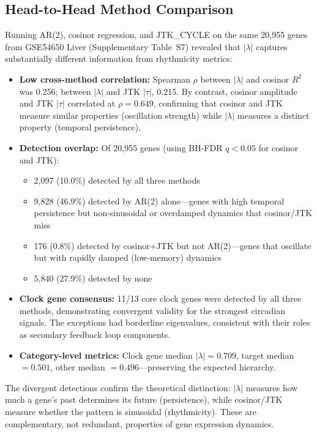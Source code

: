 \documentclass[11pt,letterpaper]{article}
\begin{document}
\subsection{Head-to-Head Method Comparison}
\label{sec:headtohead-results}

Running AR(2), cosinor regression, and JTK\_CYCLE on the same 20,955 genes from GSE54650 Liver (Supplementary Table~S7) revealed that $|\lambda|$ captures substantially different information from rhythmicity metrics:

\begin{itemize}
\item \textbf{Low cross-method correlation:} Spearman $\rho$ between $|\lambda|$ and cosinor $R^2$ was 0.256; between $|\lambda|$ and JTK $|\tau|$, 0.215. By contrast, cosinor amplitude and JTK $|\tau|$ correlated at $\rho = 0.649$, confirming that cosinor and JTK measure similar properties (oscillation strength) while $|\lambda|$ measures a distinct property (temporal persistence).

\item \textbf{Detection overlap:} Of 20,955 genes (using BH-FDR $q < 0.05$ for cosinor and JTK):
  \begin{itemize}
  \item 2,097 (10.0\%) detected by all three methods
  \item 9,828 (46.9\%) detected by AR(2) alone---genes with high temporal persistence but non-sinusoidal or overdamped dynamics that cosinor/JTK miss
  \item 176 (0.8\%) detected by cosinor+JTK but not AR(2)---genes that oscillate but with rapidly damped (low-memory) dynamics
  \item 5,840 (27.9\%) detected by none
  \end{itemize}

\item \textbf{Clock gene consensus:} 11/13 core clock genes were detected by all three methods, demonstrating convergent validity for the strongest circadian signals. The exceptions had borderline eigenvalues, consistent with their roles as secondary feedback loop components.

\item \textbf{Category-level metrics:} Clock gene median $|\lambda| = 0.709$, target median $= 0.501$, other median $= 0.496$---preserving the expected hierarchy.
\end{itemize}

The divergent detections confirm the theoretical distinction: $|\lambda|$ measures how much a gene's past determines its future (persistence), while cosinor/JTK measure whether the pattern is sinusoidal (rhythmicity). These are complementary, not redundant, properties of gene expression dynamics.
\end{document}

